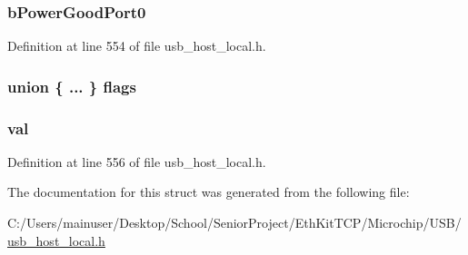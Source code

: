 \subsubsection[{b\+Power\+Good\+Port0}]{ b\+Power\+Good\+Port0}\label{struct___u_s_b___r_o_o_t___h_u_b___i_n_f_o_a84ed05a68dfd383840e3db95e968ac3c}


Definition at line 554 of file usb\+\_\+host\+\_\+local.\+h.

\hypertarget{struct___u_s_b___r_o_o_t___h_u_b___i_n_f_o_ab8049099997db84d308653c2d6f5730d}{}
\subsubsection[{flags}]{\setlength{\rightskip}{0pt plus 5cm}union \{ ... \}                     flags}\label{struct___u_s_b___r_o_o_t___h_u_b___i_n_f_o_ab8049099997db84d308653c2d6f5730d}
\hypertarget{struct___u_s_b___r_o_o_t___h_u_b___i_n_f_o_a5986ea8162aa0f6608b36b20964044dd}{}
\subsubsection[{val}]{ val}\label{struct___u_s_b___r_o_o_t___h_u_b___i_n_f_o_a5986ea8162aa0f6608b36b20964044dd}


Definition at line 556 of file usb\+\_\+host\+\_\+local.\+h.



The documentation for this struct was generated from the following file\+:\begin{DoxyCompactItemize}
\item 
C\+:/\+Users/mainuser/\+Desktop/\+School/\+Senior\+Project/\+Eth\+Kit\+T\+C\+P/\+Microchip/\+U\+S\+B/\hyperlink{usb__host__local_8h}{usb\+\_\+host\+\_\+local.\+h}\end{DoxyCompactItemize}
